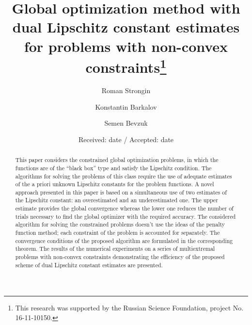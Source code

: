 \documentclass[twocolumn]{svjour3}          %
\begin{document}
\title{Global optimization method with dual Lipschitz constant estimates for problems with non-convex constraints\thanks{This research was supported by the Russian Science Foundation, project No. 16-11-10150.}
}

\author{Roman Strongin        \and
        Konstantin Barkalov   \and
				Semen Bevzuk
}


\date{Received: date / Accepted: date}


\maketitle

\begin{abstract}
This paper considers the constrained global optimization problems, in which the functions are of the “black box” type and satisfy the Lipschitz condition. The algorithms for solving the problems of this class require the use of adequate estimates of the a priori unknown Lipschitz constants for the problem functions. A novel approach presented in this paper is based on a simultaneous use of two estimates of the Lipschitz constant: an overestimated and an underestimated one. The upper estimate provides the global convergence whereas the lower one reduces the number of trials necessary to find the global optimizer with the required accuracy. The considered algorithm for solving the constrained problems doesn’t use the ideas of the penalty function method; each constraint of the problem is accounted for separately. The convergence conditions of the proposed algorithm are formulated in the corresponding theorem. The results of the numerical experiments on a series of multiextremal problems with non-convex constraints demonstrating the efficiency of the proposed scheme of dual Lipschitz constant estimates are presented.
\end{abstract}
\end{document}
